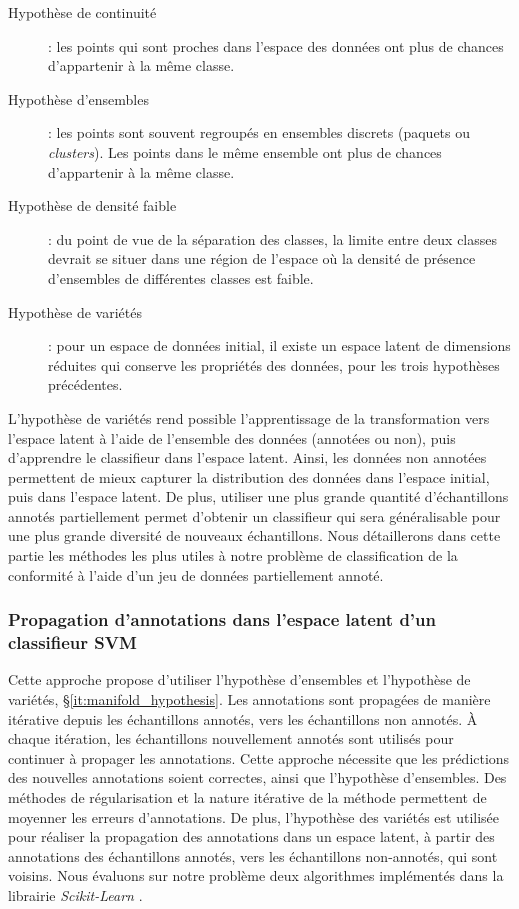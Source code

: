 \begin{description} \label{it:manifold_hypothesis}
    \item[Hypothèse de continuité] : les points qui sont proches dans l'espace des données ont plus de chances d'appartenir à la même classe.
    \item[Hypothèse d'ensembles] : les points sont souvent regroupés en ensembles discrets (paquets ou \textit{clusters}). Les points dans le même ensemble ont plus de chances d'appartenir à la même classe.
    \item[Hypothèse de densité faible] : du point de vue de la séparation des classes, la limite entre deux classes devrait se situer dans une région de l'espace où la densité de présence d'ensembles de différentes classes est faible.
    \item[Hypothèse de variétés] : pour un espace de données initial, il existe un espace latent de dimensions réduites qui conserve les propriétés des données, pour les trois hypothèses précédentes.
\end{description}

L'hypothèse de variétés rend possible l'apprentissage de la transformation vers l'espace latent à l'aide de l'ensemble des données (annotées ou non), puis d'apprendre le classifieur dans l'espace latent.
Ainsi, les données non annotées permettent de mieux capturer la distribution des données dans l'espace initial, puis dans l'espace latent.
De plus, utiliser une plus grande quantité d'échantillons annotés partiellement permet d'obtenir un classifieur qui sera généralisable pour une plus grande diversité de nouveaux échantillons.
Nous détaillerons dans cette partie les méthodes les plus utiles à notre problème de classification de la conformité à l'aide d'un jeu de données partiellement annoté.

\subsubsection{Propagation d'annotations dans l'espace latent d'un classifieur SVM} \label{subsubsec:propagation}
Cette approche propose d'utiliser l'hypothèse d'ensembles et l'hypothèse de variétés, §\ref{it:manifold_hypothesis}.
Les annotations sont propagées de manière itérative depuis les échantillons annotés, vers les échantillons non annotés.
À chaque itération, les échantillons nouvellement annotés sont utilisés pour continuer à propager les annotations.
Cette approche nécessite que les prédictions des nouvelles annotations soient correctes, ainsi que l'hypothèse d'ensembles.
Des méthodes de régularisation et la nature itérative de la méthode permettent de moyenner les erreurs d'annotations.
De plus, l'hypothèse des variétés est utilisée pour réaliser la propagation des annotations dans un espace latent, à partir des annotations des échantillons annotés, vers les échantillons non-annotés, qui sont voisins.
Nous évaluons sur notre problème deux algorithmes implémentés dans la librairie \textit{Scikit-Learn} \cite{pedregosa_scikit-learn_2011}.

